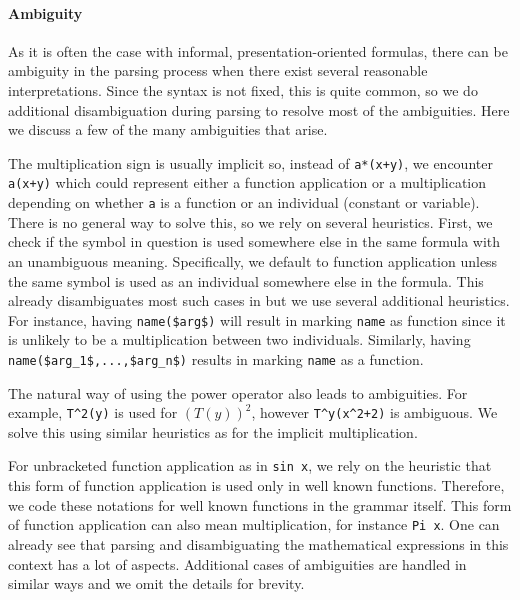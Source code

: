 \paragraph{Ambiguity}
As it is often the case with informal, presentation-oriented formulas, there can be
ambiguity in the parsing process when there exist several reasonable
interpretations. Since the \oeis syntax is not fixed, this is quite common, so we do
additional disambiguation during parsing to resolve most of the ambiguities. Here we
discuss a few of the many ambiguities that arise.

The multiplication sign is usually implicit so, instead of \lstinline!a*(x+y)!, we
encounter \lstinline!a(x+y)! which could represent either a function application or a
multiplication depending on whether \lstinline!a! is a function or an individual (constant
or variable).  There is no general way to solve this, so we rely on several
heuristics. First, we check if the symbol in question is used somewhere else in the same
formula with an unambiguous meaning.  Specifically, we default to function application
unless the same symbol is used as an individual somewhere else in the formula. This
already disambiguates most such cases in \oeis but we use several additional
heuristics. For instance, having \lstinline[mathescape]!name($arg$)! will result in
marking \lstinline!name! as function since it is unlikely to be a multiplication between
two individuals. Similarly, having \lstinline[mathescape]!name($arg_1$,...,$arg_n$)!
results in marking \lstinline!name! as a function.

The natural way of using the power operator also leads to ambiguities. For example,
\lstinline!T^2(y)! is used for $(T(y))^2$, however \lstinline!T^y(x^2+2)! is ambiguous.
We solve this using similar heuristics as for the implicit multiplication.

For unbracketed function application as in \lstinline!sin x!, we rely on the heuristic that this form of function
application is used only in well known functions. Therefore, we code these notations for well known
functions in the grammar itself. This form of function application can also mean multiplication, for instance
\lstinline!Pi x!.
One can already see that parsing and disambiguating the mathematical expressions in this context has a lot of aspects.
Additional cases of ambiguities are handled in similar ways and we omit the details for brevity.

